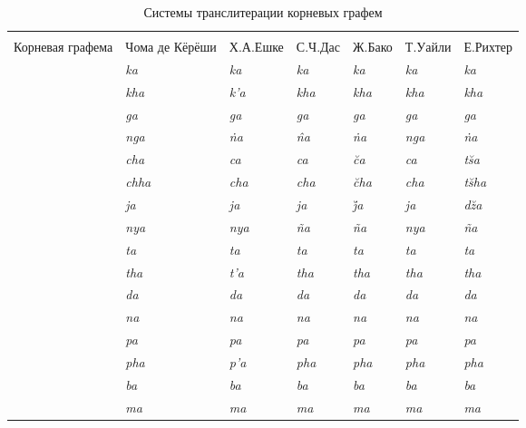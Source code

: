 \begin{longtabu} to \linewidth {|X[1,c] | X[1,c] | X[1,c] |X[1,c] |X[1,c] |X[1,c] |X[1,c] |}
	\everyrow {\tabucline{-}}
	\caption{Системы транслитерации корневых графем}\label{tab:9}\\
	Корневая графема & Чома де Кёрёши & Х.А.Ешке & С.Ч.Дас & Ж.Бако & Т.Уайли & Е.Рихтер\\
	\endhead
	 & \textit{ka} & \textit{ka} & \textit{ka} & \textit{ka} & \textit{ka} & \textit{ka}\\
	 & \textit{kha} & \textit{k'a} & \textit{kha} & \textit{kha} & \textit{kha} & \textit{kha}\\
	 & \textit{ga} & \textit{ga} & \textit{ga} & \textit{ga} & \textit{ga} & \textit{ga}\\
	 & \textit{nga} & \textit{\.{n}a} & \textit{\^{n}a} & \textit{\.{n}a} & \textit{nga} & \textit{\.{n}a}\\
	 & \textit{cha} & \textit{ca} & \textit{ca} & \textit{\u{c}a} & \textit{ca} & \textit{t\u{s}a}\\
	 & \textit{chha} & \textit{cha} & \textit{cha} & \textit{\u{c}ha} & \textit{cha} & \textit{t\u{s}ha}\\
	 & \textit{ja} & \textit{ja} & \textit{ja} & \textit{\u{j}a} & \textit{ja} & \textit{d\u{z}a}\\
	 & \textit{nya} & \textit{nya} & \textit{\~{n}a} & \textit{\~{n}a} & \textit{nya} & \textit{\~{n}a}\\
	 & \textit{ta} & \textit{ta} & \textit{ta} & \textit{ta} & \textit{ta} & \textit{ta}\\
	 & \textit{tha} & \textit{t'a} & \textit{tha} & \textit{tha} & \textit{tha} & \textit{tha}\\
	 & \textit{da} & \textit{da} & \textit{da} & \textit{da} & \textit{da} & \textit{da}\\
	 & \textit{na} & \textit{na} & \textit{na} & \textit{na} & \textit{na} & \textit{na}\\
	 & \textit{pa} & \textit{pa} & \textit{pa} & \textit{pa} & \textit{pa} & \textit{pa}\\
	 & \textit{pha} & \textit{p'a} & \textit{pha} & \textit{pha} & \textit{pha} & \textit{pha}\\
	 & \textit{ba} & \textit{ba} & \textit{ba} & \textit{ba} & \textit{ba} & \textit{ba}\\
	 & \textit{ma} & \textit{ma} & \textit{ma} & \textit{ma} & \textit{ma} & \textit{ma}\\

\end{longtabu}
